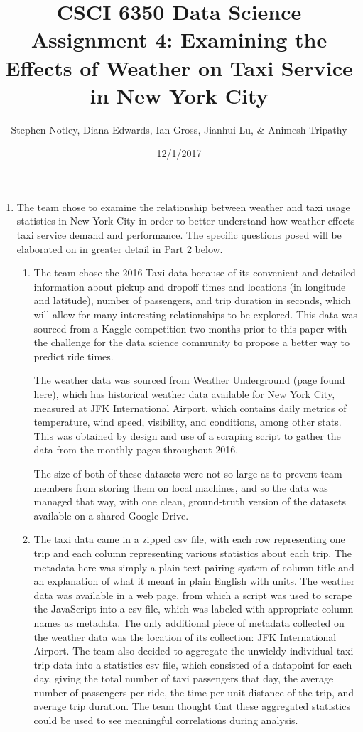 \documentclass{article}
\title{CSCI 6350 Data Science Assignment 4: Examining the Effects of Weather on Taxi Service in New York City}
\author{Stephen Notley, Diana Edwards, Ian Gross, Jianhui Lu, \& Animesh Tripathy}
\date{12/1/2017}
\begin{document}
\maketitle

\begin{enumerate}

    \item %

    The team chose to examine the relationship between weather and taxi usage statistics in New York City in order to better understand how weather effects taxi service demand and performance. The specific questions posed will be elaborated on in greater detail in Part 2 below.

    \begin{enumerate}

        \item %
        The team chose the 2016 Taxi data because of its convenient and detailed information about pickup and dropoff times and locations (in longitude and latitude), number of passengers, and trip duration in seconds, which will allow for many interesting relationships to be explored. This data was sourced from a Kaggle competition two months prior to this paper with the challenge for the data science community to propose a better way to predict ride times.  %

        The weather data was sourced from Weather Underground (page found here), which has historical weather data available for New York City, measured at JFK International Airport, which contains daily metrics of temperature, wind speed, visibility, and conditions, among other stats. This was obtained by design and use of a scraping script to gather the data from the monthly pages throughout 2016. %

        The size of both of these datasets were not so large as to prevent team members from storing them on local machines, and so the data was managed that way, with one clean, ground-truth version of the datasets available on a shared Google Drive.

        \item %
        The taxi data came in a zipped csv file, with each row representing one trip and each column representing various statistics about each trip. The metadata here was simply a plain text pairing system of column title and an explanation of what it meant in plain English with units. The weather data was available in a web page, from which a script was used to scrape the JavaScript into a csv file, which was labeled with appropriate column names as metadata. The only additional piece of metadata collected on the weather data was the location of its collection: JFK International Airport. The team also decided to aggregate the unwieldy individual taxi trip data into a statistics csv file, which consisted of a datapoint for each day, giving the total number of taxi passengers that day, the average number of passengers per ride, the time per unit distance of the trip, and average trip duration. The team thought that these aggregated statistics could be used to see meaningful correlations during analysis.
        

\end{enumerate}
\end{enumerate}
\end{document}
